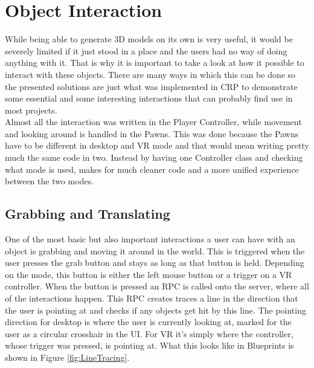 

\section{Object Interaction}\label{chp:ObjectInteraction}
While being able to generate 3D models on its own is very useful, it would be severely limited if it just stood in a place and the users had no way of doing anything with it. That is why it is important to take a look at how it possible to interact with these objects. There are many ways in which this can be done so the presented solutions are just what was implemented in \acs{CRP} to demonstrate some essential and some interesting interactions that can probably find use in most projects.\\
Almost all the interaction was written in the Player Controller, while movement and looking around is handled in the Pawns. This was done because the Pawns have to be different in desktop and VR mode and that would mean writing pretty much the same code in two. Instead by having one Controller class and checking what mode is used, makes for much cleaner code and a more unified experience between the two modes.
\subsection{Grabbing and Translating}

One of the most basic but also important interactions a user can have with an object is grabbing and moving it around in the world. This is triggered when the user presses the grab button and stays as long as that button is held. Depending on the mode, this button is either the left mouse button or a trigger on a \acs{VR} controller. When the button is pressed an \acs{RPC} is called onto the server, where all of the interactions happen. This \acs{RPC} creates traces a line in the direction that the user is pointing at and checks if any objects get hit by this line. The pointing direction for desktop is where the user is currently looking at, marked for the user as a circular crosshair in the UI. For VR it's simply where the controller, whose trigger was pressed, is pointing at. What this looks like in Blueprints is shown in Figure \ref{fig:LineTracing}.

